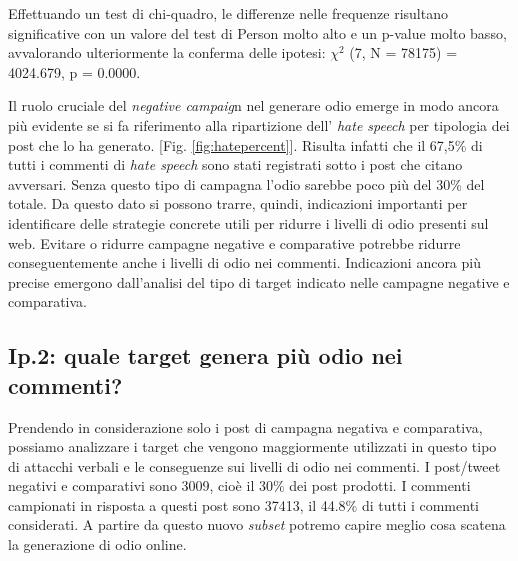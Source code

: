 Effettuando un test di chi-quadro, le differenze nelle frequenze risultano significative con un valore del test di Person molto alto e un p-value molto basso, avvalorando ulteriormente la conferma delle ipotesi: $\chi^{2}$ (7, N = 78175) = 4024.679, p = 0.0000.

Il ruolo cruciale del \textit{negative campaig}n nel generare odio emerge in modo ancora più evidente se si fa riferimento alla ripartizione dell' \textit{hate speech} per tipologia dei post che lo ha generato. [Fig. \ref{fig:hatepercent}]. Risulta infatti che il 67,5\% di tutti i commenti di \textit{hate speech} sono stati registrati sotto i post che citano avversari. Senza questo tipo di campagna l'odio sarebbe poco più del  30\% del totale.
Da questo dato si possono trarre, quindi, indicazioni importanti per identificare delle strategie concrete utili per ridurre i livelli di odio presenti sul web. Evitare o ridurre campagne negative e comparative potrebbe ridurre conseguentemente anche i livelli di odio nei commenti. Indicazioni ancora più precise emergono dall’analisi del tipo di target indicato nelle campagne negative e comparativa.

\subsection{Ip.2: quale target genera più odio nei commenti?}
Prendendo in considerazione solo i post di campagna negativa e comparativa, possiamo analizzare i target che vengono maggiormente utilizzati in questo tipo di attacchi verbali e le conseguenze sui livelli di odio nei commenti. I post/tweet negativi e comparativi sono 3009, cioè il 30\% dei post prodotti. I commenti campionati in risposta a questi post sono 37413, il 44.8\% di tutti i commenti considerati. A partire da questo nuovo \textit{subset} potremo capire meglio cosa scatena la generazione di odio online.

